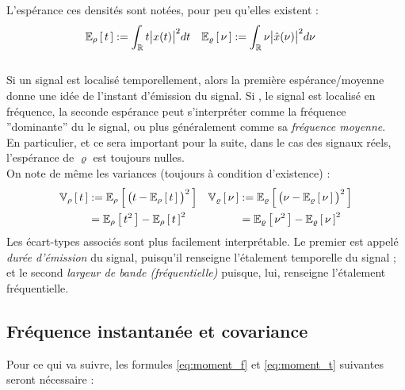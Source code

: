 \begin{definition}\label{def:band-width}
	L'espérance ces densités sont notées, pour peu qu'elles existent :
	\begin{align*}
		\esp[\rho]{t} &\defeq \int_\R t \big|x(t)\big|^2 dt   &  \esp[\varrho]{\nu} &\defeq \int_\R \nu \big|\hat{x}(\nu)\big|^2 d\nu
	\end{align*}
	\\
	Si un signal est localisé temporellement, alors la première espérance/moyenne donne une idée de l'instant d'émission du signal. Si \acontrario, le signal est localisé en fréquence, la seconde espérance peut s'interpréter comme la fréquence ''dominante'' du le signal, ou plus généralement comme sa \emph{fréquence moyenne}. \\
	En particulier, et ce sera important pour la suite, dans le cas des signaux réels, l'espérance de $\varrho$ est toujours nulles.
	\\
	On note de même les variances (toujours à condition d'existence) :
	\begin{align*}
		\var[\rho]{t} &\defeq \esp[\rho]{\big(t-\esp[\rho]{t}\big)^2}  &  \var[\varrho]{\nu} &\defeq \esp[\varrho]{\big(\nu - \esp[\varrho]{\nu}\big)^2}\\
		& = \esp[\rho]{t^2} - \esp[\rho]{t}^2  &  &= \esp[\varrho]{\nu^2} - \esp[\varrho]{\nu}^2
	\end{align*}
	Les écart-types associés sont plus facilement interprétable. Le premier est appelé \emph{durée d'émission} du signal, puisqu'il renseigne l'étalement temporelle du signal ; et le second \emph{largeur de bande (fréquentielle)} puisque, lui, renseigne l'étalement fréquentielle. 
\end{definition}



\subsection{Fréquence instantanée et covariance}

Pour ce qui va suivre, les formules \eqref{eq:moment_f} et \eqref{eq:moment_t} suivantes seront nécessaire :
\\

